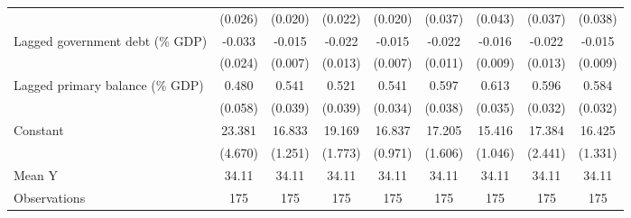{\begin{tabular}{l*{8}{c}}
                    &     (0.026)         &     (0.020)         &     (0.022)         &     (0.020)         &     (0.037)         &     (0.043)         &     (0.037)         &     (0.038)         \\
\addlinespace
Lagged government debt (\% GDP)&      -0.033         &      -0.015\sym{**} &      -0.022         &      -0.015\sym{**} &      -0.022\sym{*}  &      -0.016\sym{*}  &      -0.022         &      -0.015         \\
                    &     (0.024)         &     (0.007)         &     (0.013)         &     (0.007)         &     (0.011)         &     (0.009)         &     (0.013)         &     (0.009)         \\
\addlinespace
Lagged primary balance (\% GDP)&       0.480\sym{***}&       0.541\sym{***}&       0.521\sym{***}&       0.541\sym{***}&       0.597\sym{***}&       0.613\sym{***}&       0.596\sym{***}&       0.584\sym{***}\\
                    &     (0.058)         &     (0.039)         &     (0.039)         &     (0.034)         &     (0.038)         &     (0.035)         &     (0.032)         &     (0.032)         \\
\addlinespace
Constant            &      23.381\sym{***}&      16.833\sym{***}&      19.169\sym{***}&      16.837\sym{***}&      17.205\sym{***}&      15.416\sym{***}&      17.384\sym{***}&      16.425\sym{***}\\
                    &     (4.670)         &     (1.251)         &     (1.773)         &     (0.971)         &     (1.606)         &     (1.046)         &     (2.441)         &     (1.331)         \\
\midrule
Mean Y              &       34.11         &       34.11         &       34.11         &       34.11         &       34.11         &       34.11         &       34.11         &       34.11         \\
Observations        &         175         &         175         &         175         &         175         &         175         &         175         &         175         &         175         \\
\bottomrule
\end{tabular}
}
